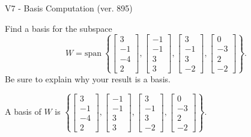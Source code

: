 \begin{exercise}
  \begin{exerciseTitle}V7 - Basis Computation (ver. 895)\end{exerciseTitle}
  \begin{exerciseStatement}
    Find a basis for the subspace 
\[W=\mathrm{span}\ \left\{\left[\begin{array}{r}
3 \\
-1 \\
-4 \\
2
\end{array}\right] , \left[\begin{array}{r}
-1 \\
-1 \\
3 \\
3
\end{array}\right] , \left[\begin{array}{r}
3 \\
-1 \\
3 \\
-2
\end{array}\right] , \left[\begin{array}{r}
0 \\
-3 \\
2 \\
-2
\end{array}\right]\right\}.\]
 Be sure to explain why your result is a basis.


  \end{exerciseStatement}
  \begin{exerciseAnswer}
   A basis of \(W\) is  \(\left\{\left[\begin{array}{r}
3 \\
-1 \\
-4 \\
2
\end{array}\right] , \left[\begin{array}{r}
-1 \\
-1 \\
3 \\
3
\end{array}\right] , \left[\begin{array}{r}
3 \\
-1 \\
3 \\
-2
\end{array}\right] , \left[\begin{array}{r}
0 \\
-3 \\
2 \\
-2
\end{array}\right]\right\}\).
  


  \end{exerciseAnswer}
\end{exercise}